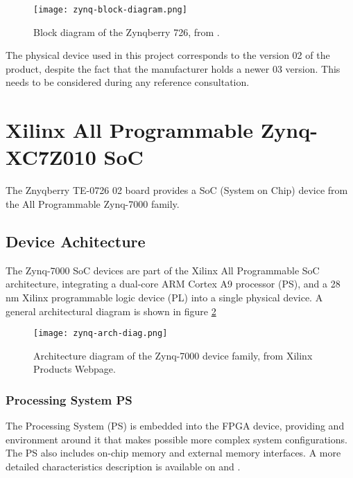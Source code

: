 \begin{figure}
	\centering
	\texttt{[image: zynq-block-diagram.png]}
	\caption{Block diagram of the Zynqberry 726, from \cite{zynq-trm}.}	\label{fig:zynqblock}
\end{figure}

The physical device used in this project corresponds to the version 02 of the product, despite the fact that the manufacturer holds a newer 03 version. This needs to be considered during any reference consultation.

\section{Xilinx All Programmable Zynq-XC7Z010 SoC}

The Znyqberry TE-0726 02 board provides a SoC (System on Chip) device from the All Programmable Zynq-7000 family.

\subsection{Device Achitecture}

The Zynq-7000 SoC devices are part of the Xilinx All Programmable SoC architecture, integrating a dual-core ARM Cortex A9 processor (PS), and a 28 nm Xilinx programmable logic device (PL) into a single physical device. A general architectural diagram is shown in figure \ref{fig:zynq-arch-diag}

\begin{figure}
	\centering
	\texttt{[image: zynq-arch-diag.png]}
	\caption[Block diagram of the Zynq-7000 device family, from Xilinx Products Webpage.]{Architecture diagram of the Zynq-7000 device family, from Xilinx Products Webpage.\protect\footnotemark} \label{fig:zynq-arch-diag}
\end{figure}


\subsubsection{Processing System PS}

The Processing System (PS) is embedded into the FPGA device, providing and environment around it that makes possible more complex system configurations. The PS also includes on-chip memory and external memory interfaces. A more detailed characteristics description is available on \cite{DS190} and \cite{UG585}.

